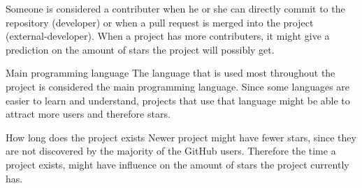 \begin{LaTeXdescription}
        Someone is considered a contributer when he or she can directly commit to the repository (developer) or when a pull request is merged into the project (external-developer).
        When a project has more contributers, it might give a prediction on the amount of stars the project will possibly get.
        \item[Main programming language]
        The language that is used most throughout the project is considered the main programming language. 
        Since some languages are easier to learn and understand, projects that use that language might be able to attract more users and therefore stars.
        \item[How long does the project exists]
        Newer project might have fewer stars, since they are not discovered by the majority of the GitHub users. 
        Therefore the time a project exists, might have influence on the amount of stars the project currently has.
    \end{LaTeXdescription}


